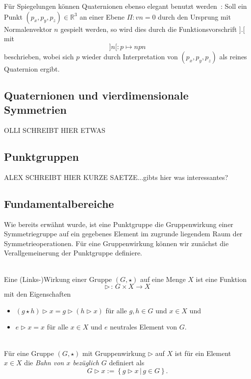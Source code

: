 \noindent Für Spiegelungen können Quaternionen ebenso elegant benutzt werden~\cite{1946}: Soll ein Punkt  $(p_x, p_y, p_z) \in \mathbb{R}^3$
an einer Ebene $\Pi: vn = 0$ durch den Ursprung mit Normalenvektor $n$ gespielt werden, so wird dies durch die Funktionsvorschrift $].[$ mit
\begin{equation*}
]n[: p \mapsto n p n
\end{equation*}
beschrieben, wobei sich $p$ wieder durch Interpretation von $(p_x, p_y, p_z)$ als reines Quaternion ergibt.

\subsection{Quaternionen und vierdimensionale Symmetrien}
OLLI SCHREIBT HIER ETWAS

\subsection{Punktgruppen}
ALEX SCHREIBT HIER KURZE SAETZE...gibts hier was interessantes?

\subsection{Fundamentalbereiche}\label{fundamentalbereich}

Wie bereits erwähnt wurde, ist eine Punktgruppe die Gruppenwirkung einer Symmetriegruppe auf ein gegebenes Element im zugrunde liegendem Raum der Symmetrieoperationen.
Für eine Gruppenwirkung können wir zunächst die Verallgemeinerung der Punktgruppe definiere.

\begin{definition}[Gruppenwirkung]\label{fundamentalbereich:wirking} \mbox{}\\
 Eine (Links-)Wirkung einer Gruppe $(G, \star)$ auf eine Menge $X$ ist eine Funktion
   $$
      \rhd \, : \, G \times X \longrightarrow X
   $$
   mit den Eigenschaften
   \begin{itemize}
      \item $(g \star h) \rhd x = g \rhd (h \rhd x)$ für alle $g,h \in G$ und $x \in X$ und
      \item $e \rhd x = x$ für alle $x \in X$ und $e$ neutrales Element von $G$.
   \end{itemize}
\end{definition}

\begin{definition}[Orbit] \label{fundamentalbereich:orbit} \mbox{}\\
  Für eine Gruppe $(G, \star)$ mit Gruppenwirkung $\rhd$ auf $X$ ist für ein Element $x \in X$ die \emph{Bahn von $x$ bezüglich $G$} definiert als
   $$
      G \rhd x := \left\{ g \rhd x \, | \, g \in G \right\}.
   $$
\end{definition}


